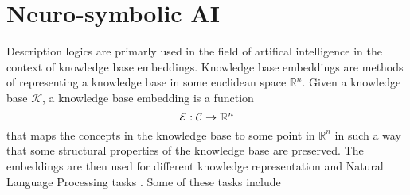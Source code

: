 

%
\chapter*{\thechapter \quad Neuro-symbolic AI}
\label{appendixB}

Description logics are primarly used in the field of artifical intelligence in the context of knowledge base embeddings.
Knowledge base embeddings are methods of representing a knowledge base in some euclidean space $\mathbb{R}^n$.
Given a knowledge base $\mathcal{K}$, a knowledge base embedding is a function
\[
    \mathcal{E} : \mathcal{C} \rightarrow \mathbb{R}^n
\]
that maps the concepts in the knowledge base to some point in $\mathbb{R}^n$ 
in such a way that some structural properties of the knowledge base are preserved. The embeddings are then used
for different knowledge representation and Natural Language Processing tasks \cite{SurveryKG}.
Some of these tasks include
